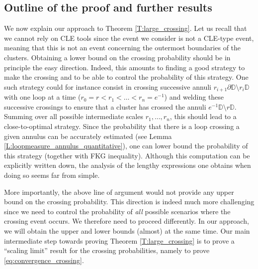 \documentclass[11pt]{article}
\theoremstyle{remark}
\newcommand{\D}{\mathbb{D}}
\numberwithin{equation}{section}
\begin{document}
\subsection{Outline of the proof and further results}\label{S:intro_outline}
We now explain our approach to Theorem \ref{T:large_crossing}. Let us recall that we cannot rely on CLE tools since the event we consider is not a CLE-type event, meaning that this is not an event concerning the outermost boundaries of the clusters.
Obtaining a lower bound on the crossing probability should be in principle the easy direction. Indeed, this amounts to finding a good strategy to make the crossing and to be able to control the probability of this strategy. One such strategy could for instance consist in crossing successive annuli $r_{i+1} \partial \D \setminus r_{i} \D$ with one loop at a time ($r_0 = r < r_1 < \dots < r_n = e^{-1}$) and welding these successive crossings to ensure that a cluster has crossed the annuli $e^{-1} \D \setminus r \D$. Summing over all possible intermediate scales $r_1, \dots, r_n$, this should lead to a close-to-optimal strategy. Since the probability that there is a loop crossing a given annulus can be accurately estimated (see Lemma \ref{L:loopmeasure_annulus_quantitative}), one can lower bound the probability of this strategy (together with FKG inequality).
Although this computation can be explicitly written down, the analysis of the lengthy expressions one obtains when doing so seems far from simple.

More importantly, the above line of argument would not provide any upper bound on the crossing probability. This direction is indeed much more challenging since we need to control the probability of \emph{all} possible scenarios where the crossing event occurs. 
We therefore need to proceed differently. In our approach, we will obtain the upper and lower bounds (almost) at the same time.
Our main intermediate step towards proving Theorem \ref{T:large_crossing} is to prove a ``scaling limit'' result for the crossing probabilities, namely to prove \eqref{eq:convergence_crossing}.
\end{document}
